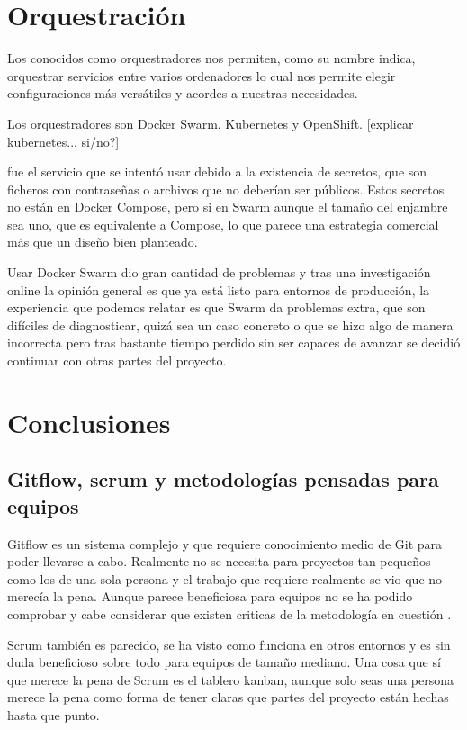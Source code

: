 \section{Orquestración}

Los conocidos como orquestradores nos permiten, como su nombre indica, orquestrar servicios entre varios ordenadores lo cual nos permite elegir configuraciones más versátiles y acordes a nuestras necesidades. 

Los orquestradores son Docker Swarm, Kubernetes y OpenShift. [explicar kubernetes... si/no?]

 fue el servicio que se intentó usar debido a la existencia de secretos, que son ficheros con contraseñas o archivos que no deberían ser públicos. Estos secretos no están en Docker Compose, pero si en Swarm aunque el tamaño del enjambre sea uno, que es equivalente a Compose, lo que parece una estrategia comercial más que un diseño bien planteado.

Usar Docker Swarm dio gran cantidad de problemas y tras una investigación online la opinión general es que ya está listo para entornos de producción, la experiencia que podemos relatar es que Swarm da problemas extra, que son difíciles de diagnosticar, quizá sea un caso concreto o que se hizo algo de manera incorrecta pero tras bastante tiempo perdido sin ser capaces de avanzar se decidió continuar con otras partes del proyecto.


\section{Conclusiones}

\subsection{Gitflow, scrum y metodologías pensadas para equipos}

Gitflow es un sistema complejo y que requiere conocimiento medio de Git para poder llevarse a cabo. Realmente no se necesita para proyectos tan pequeños como los de una sola persona y el trabajo que requiere realmente se vio que no merecía la pena. Aunque parece beneficiosa para equipos no se ha podido comprobar y cabe considerar que existen criticas de la metodología en cuestión \cite{gfharm}.

Scrum también es parecido, se ha visto como funciona en otros entornos y es sin duda beneficioso sobre todo para equipos de tamaño mediano. Una cosa que sí que merece la pena de Scrum es el tablero kanban, aunque solo seas una persona merece la pena como forma de tener claras que partes del proyecto están hechas hasta que punto.

